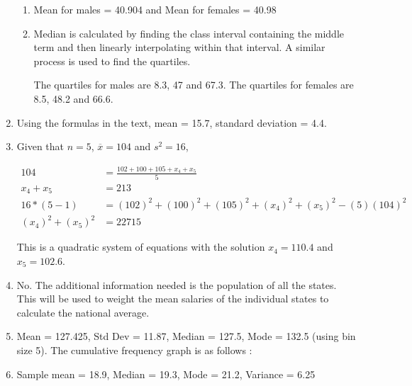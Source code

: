 \begin{enumerate}
	\begin{enumerate}
		\item Mean for males = 40.904  and Mean for females = 40.98\\
		\item Median is calculated by finding the class interval containing the middle term and then linearly interpolating within that interval. A similar process is used to find the quartiles.
		
		The quartiles for males are 8.3, 47 and 67.3.
		The quartiles for females are 8.5, 48.2 and 66.6.
	\end{enumerate}
	
	\item Using the formulas in the text, mean =  15.7, standard deviation = 4.4.
	
	\item Given that $ n = 5 $, $ \overline{x} = 104 $ and $ s^2 = 16 $, 
	
	
		\begin{align}
			104 &= \frac{ 102 + 100 + 105 + x_{4} + x_{5} }{5} \\
			x_4 + x_5 &= 213 \\
			16 * (5 - 1) &= (102)^2 + (100)^2 + (105)^2 + (x_4)^2 + (x_5)^2  - (5)(104)^2 \\
			(x_4)^2 + (x_5)^2 &= 22715
		\end{align}
		
		This is a quadratic system of equations with the solution $ x_4 = 110.4 $ and $ x_5 = 102.6 $.
	
	
	\item No. The additional information needed is the population of all the states. This will be used to weight the mean salaries of the individual states to calculate the national average.
	
	\item Mean = 127.425, Std Dev = 11.87, Median = 127.5, Mode = 132.5 (using bin size 5).
	The cumulative frequency graph is as follows : 
	
	
	\item Sample mean = 18.9, Median = 19.3, Mode = 21.2, Variance =  6.25\\
	\begin{figure}[H]
		\centering
		
	\end{figure}
	

\end{enumerate}
